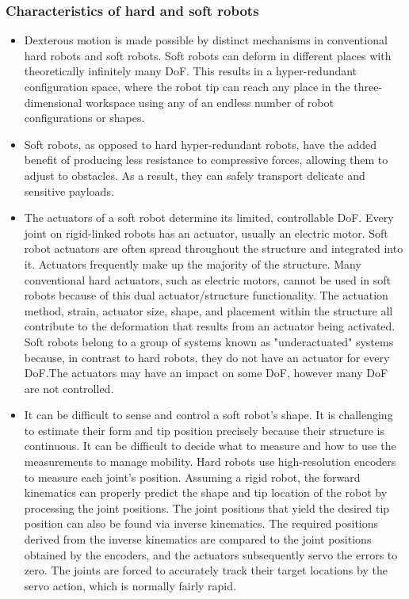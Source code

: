 \documentclass[12pt,twoside,a4]{mwbk}
\begin{document}
\subsubsection{Characteristics of hard and soft robots}
\begin{itemize}
    \item Dexterous motion is made possible by distinct mechanisms in conventional hard robots and soft robots. Soft robots can deform in different places with theoretically infinitely many DoF. This results in a hyper-redundant configuration space, where the robot tip can reach any place in the three-dimensional workspace using any of an endless number of robot configurations or shapes.
    \item Soft robots, as opposed to hard hyper-redundant robots, have the added benefit of producing less resistance to compressive forces, allowing them to adjust to obstacles. As a result, they can safely transport delicate and sensitive payloads.
    \item The actuators of a soft robot determine its limited, controllable DoF. Every joint on rigid-linked robots has an actuator, usually an electric motor. Soft robot actuators are often spread throughout the structure and integrated into it. Actuators frequently make up the majority of the structure. Many conventional hard actuators, such as electric motors, cannot be used in soft robots because of this dual actuator/structure functionality. The actuation method, strain, actuator size, shape, and placement within the structure all contribute to the deformation that results from an actuator being activated. Soft robots belong to a group of systems known as "underactuated" systems because, in contrast to hard robots, they do not have an actuator for every DoF.The actuators may have an impact on some DoF, however many DoF are not controlled.
    \item It can be difficult to sense and control a soft robot's shape. It is challenging to estimate their form and tip position precisely because their structure is continuous. It can be difficult to decide what to measure and how to use the measurements to manage mobility. Hard robots use high-resolution encoders to measure each joint's position. Assuming a rigid robot, the forward kinematics can properly predict the shape and tip location of the robot by processing the joint positions. The joint positions that yield the desired tip position can also be found via inverse kinematics. The required positions derived from the inverse kinematics are compared to the joint positions obtained by the encoders, and the actuators subsequently servo the errors to zero. The joints are forced to accurately track their target locations by the servo action, which is normally fairly rapid.

\end{itemize}
\end{document}
